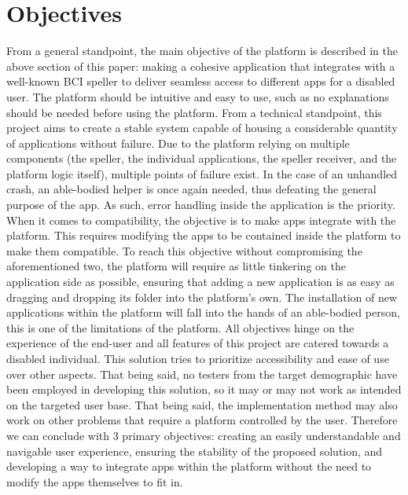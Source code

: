 \section{Objectives}\label{sect:objectives}
From a general standpoint, the main objective of the platform is described in the above section of this paper: making a cohesive application that integrates with a well-known BCI speller to deliver seamless access to different apps for a disabled user. The platform should be intuitive and easy to use, such as no explanations should be needed before using the platform. 
\vspace{\baselineskip}\newline 
From a technical standpoint, this project aims to create a stable system capable of housing a considerable quantity of applications without failure. Due to the platform relying on multiple components (the speller, the individual applications, the speller receiver, and the platform logic itself), multiple points of failure exist. In the case of an unhandled crash, an able-bodied helper is once again needed, thus defeating the general purpose of the app. As such, error handling inside the application is the priority. 
\vspace{\baselineskip}\newline
When it comes to compatibility, the objective is to make apps integrate with the platform. This requires modifying the apps to be contained inside the platform to make them compatible. To reach this objective without compromising the aforementioned two, the platform will require as little tinkering on the application side as possible, ensuring that adding a new application is as easy as dragging and dropping its folder into the platform's own. The installation of new applications within the platform will fall into the hands of an able-bodied person, this is one of the limitations of the platform. 
\vspace{\baselineskip}\newline
All objectives hinge on the experience of the end-user and all features of this project are catered towards a disabled individual. This solution tries to prioritize accessibility and ease of use over other aspects. That being said, no testers from the target demographic have been employed in developing this solution, so it may or may not work as intended on the targeted user base. That being said, the implementation method may also work on other problems that require a platform controlled by the user.
\vspace{\baselineskip}\newline
Therefore we can conclude with 3 primary objectives: creating an easily understandable and navigable user experience, ensuring the stability of the proposed solution, and developing a way to integrate apps within the platform without the need to modify the apps themselves to fit in.



